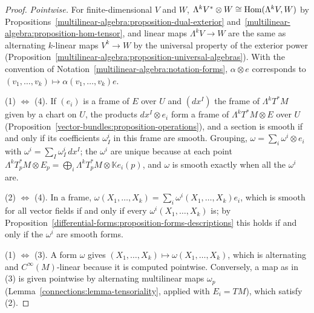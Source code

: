 \begin{proof}
\emph{Pointwise.} For finite-dimensional $V$ and $W$, $\Lambda^kV^* \otimes W \cong \operatorname{Hom}(\Lambda^kV, W)$ by Propositions~\ref{multilinear-algebra:proposition-dual-exterior}
and~\ref{multilinear-algebra:proposition-hom-tensor}, and linear maps $\Lambda^kV \to W$ are the same as alternating $k$-linear maps $V^k \to W$ by the universal property of
the exterior power (Proposition~\ref{multilinear-algebra:proposition-universal-algebras}). With the convention of Notation~\ref{multilinear-algebra:notation-forms}, $\alpha \otimes e$
corresponds to $(v_1, \ldots, v_k) \mapsto \alpha(v_1, \ldots, v_k)e$.

(1) $\Leftrightarrow$ (4). If $(e_i)$ is a frame of $E$ over $U$ and $(dx^I)$ the frame of $\Lambda^kT^*M$ given by a chart on $U$, the products $dx^I \otimes e_i$ form a frame
of $\Lambda^kT^*M \otimes E$ over $U$ (Proposition~\ref{vector-bundles:proposition-operations}), and a section is smooth if and only if its coefficients $\omega^i_I$ in this frame are smooth.
Grouping, $\omega = \sum_i\omega^i \otimes e_i$ with $\omega^i = \sum_I\omega^i_I\,dx^I$; the $\omega^i$ are unique because at each point
$\Lambda^kT_p^*M \otimes E_p = \bigoplus_i\Lambda^kT_p^*M \otimes \mathbb{K}e_i(p)$, and $\omega$ is smooth exactly when all the $\omega^i$ are.

(2) $\Leftrightarrow$ (4). In a frame, $\omega(X_1, \ldots, X_k) = \sum_i\omega^i(X_1, \ldots, X_k)e_i$, which is smooth for all vector fields if and only if every
$\omega^i(X_1, \ldots, X_k)$ is; by Proposition~\ref{differential-forms:proposition-forms-descriptions} this holds if and only if the $\omega^i$ are smooth forms.

(1) $\Leftrightarrow$ (3). A form $\omega$ gives $(X_1, \ldots, X_k) \mapsto \omega(X_1, \ldots, X_k)$, which is alternating and $C^\infty(M)$-linear because it is computed
pointwise. Conversely, a map as in (3) is given pointwise by alternating multilinear maps $\omega_p$ (Lemma~\ref{connections:lemma-tensoriality}, applied with $E_i = TM$),
which satisfy (2).
\end{proof}

